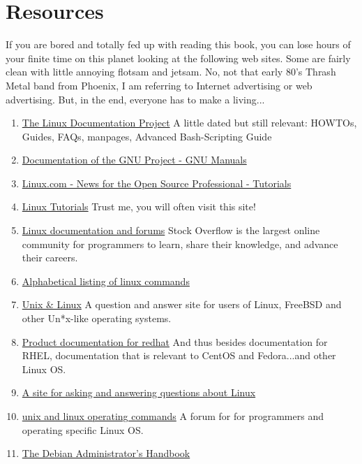\section{Resources}

If you are bored and totally fed up with reading this book, you can lose hours of your finite time on this planet looking at the following web sites. Some are fairly clean with little annoying flotsam and jetsam. No, not that early 80's Thrash Metal band from Phoenix, I am referring to Internet advertising or web advertising. But, in the end, everyone has to make a living...

\begin{enumerate}
	\item{\href{http://tldp.org}{The Linux Documentation Project}} 
		A little dated but still relevant: HOWTOs, Guides, FAQs, manpages, Advanced Bash-Scripting Guide
	\item{\href{https://www.gnu.org/doc/doc.en.html}{Documentation of the GNU Project - GNU Manuals}}
	\item{\href{https://www.linux.com/tutorials}{Linux.com - News for the Open Source Professional - Tutorials}}
	\item{\href{https://www.howtoforge.com/}{Linux Tutorials}} 
		Trust me, you will often visit this site!
	\item{\href{http://stackoverflow.com}{Linux documentation and forums}} 
		Stock Overflow is the largest online community for programmers to learn, share their knowledge, and advance their careers.
	\item{\href{http://fedoralinuxcommands.blogspot.ca/}{Alphabetical listing of linux commands}} 
	\item{\href{http://unix.stackexchange.com/}{Unix \& Linux}} 
		A question and answer site for users of Linux, FreeBSD and other Un*x-like operating systems.
	\item{\href{https://access.redhat.com/documentation/en/}{Product documentation for redhat}} 
		And thus besides documentation for RHEL, documentation that is relevant to CentOS and Fedora...and other Linux OS.
	\item{\href{http://www.linuxquestions.org}{A site for asking and answering questions about Linux}}
	\item{\href{http://www.unix.com}{unix and linux operating commands}} 
		A forum for for programmers and operating specific Linux OS.
	\item{\href{https://debian-handbook.info/}{The Debian Administrator's Handbook}} 
\end{enumerate}

